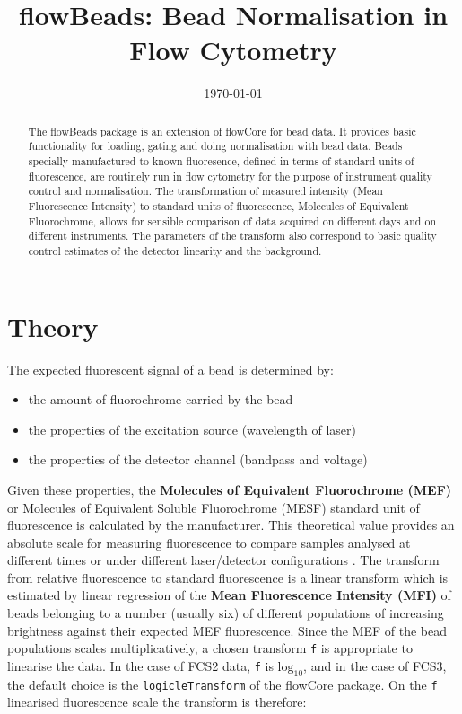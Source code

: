 \documentclass[11pt]{article}
\title{flowBeads: Bead Normalisation in Flow Cytometry}
\date{\today}
\newcommand{\Rfunction}[1]{{\texttt{#1}}}
\newcommand{\Rpackage}[1]{{\textsf{#1}}}
\begin{document}

\maketitle

\begin{abstract}
    The \Rpackage{flowBeads} package is an extension of \Rpackage{flowCore} for bead data.
    It provides basic functionality for loading, gating and doing normalisation with bead data.
    Beads specially manufactured to known fluoresence,  defined in terms of standard units of fluorescence, are routinely run in flow cytometry
    for the purpose of instrument quality control and normalisation.
    The transformation of measured intensity (Mean Fluorescence Intensity) to standard units of fluorescence,
    Molecules of Equivalent Fluorochrome, allows for sensible comparison of data acquired on different days and on different instruments.
    The parameters of the transform also correspond to basic quality control estimates of the detector linearity and the background.
\end{abstract}




\section{Theory}

The expected fluorescent signal of a bead is determined by:
\begin{itemize}
    \item the amount of fluorochrome carried by the bead
    \item the properties of the excitation source (wavelength of laser)
    \item the properties of the detector channel (bandpass and voltage)
\end{itemize}
Given these properties, the \textbf{Molecules of Equivalent Fluorochrome (MEF)} or Molecules of Equivalent Soluble Fluorochrome (MESF)
standard unit of fluorescence is calculated by the manufacturer.
This theoretical value provides an absolute scale for measuring fluorescence 
to compare samples analysed at different times or under different laser/detector configurations \citep{Schwartz:1996,Dendrou:2009}.
The transform from relative fluorescence to standard fluorescence is a linear transform which is estimated 
by linear regression of the \textbf{Mean Fluorescence Intensity (MFI)} of beads belonging to a number (usually six) of different populations
of increasing brightness against their expected MEF fluorescence.
Since the MEF of the bead populations scales multiplicatively, a chosen transform \texttt{f} is appropriate to linearise the data.
In the case of FCS2 data, \texttt{f} is $\text{log}_{10}$, and in the case of FCS3, the default choice is the \Rfunction{logicleTransform} of the \Rpackage{flowCore}
package.
On the \texttt{f} linearised fluorescence scale the transform is therefore:
\end{document}
